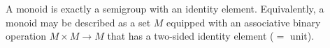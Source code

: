A monoid is exactly a semigroup with an identity element. Equivalently, a monoid may be described as a set $M$ equipped with an associative binary operation $M \times M \to M$ that has a two-sided identity element ($=$ unit).

